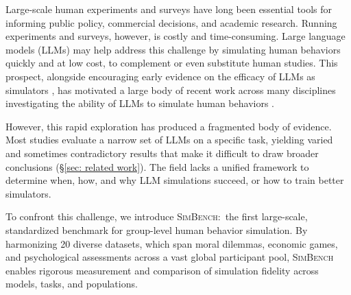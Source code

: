 \documentclass{article} %
\begin{document}
Large-scale human experiments and surveys have long been essential tools for informing public policy, commercial decisions, and academic research.
Running experiments and surveys, however, is costly and time-consuming.
Large language models (LLMs) may help address this challenge by simulating human behaviors quickly and at low cost, to complement or even substitute human studies.
This prospect, alongside encouraging early evidence on the efficacy of LLMs as simulators \citep{Aher2023Using,Argyle_Busby_Fulda_Gubler_Rytting_Wingate_2023,horton2023large}, has motivated a large body of recent work across many disciplines investigating the ability of LLMs to simulate human behaviors \citep[][inter alia]{Bisbee_Clinton_Dorff_Kenkel_Larson_2024,NEURIPS2024_Dominguez,manning2024automated,binz2024centaur,hu2025inews}.~


However, this rapid exploration has produced a fragmented body of evidence. Most studies evaluate a narrow set of LLMs on a specific task, yielding varied and sometimes contradictory results that make it difficult to draw broader conclusions (\S\ref{sec: related work}). The field lacks a unified framework to determine when, how, and why LLM simulations succeed, or how to train better simulators.



To confront this challenge, we introduce \textsc{SimBench}:\ the first large-scale, standardized benchmark for group-level human behavior simulation.
By harmonizing 20 diverse datasets, which span moral dilemmas, economic games, and psychological assessments across a vast global participant 
pool, \textsc{SimBench} enables rigorous measurement and comparison of simulation fidelity across models, tasks, and populations.
\end{document}
